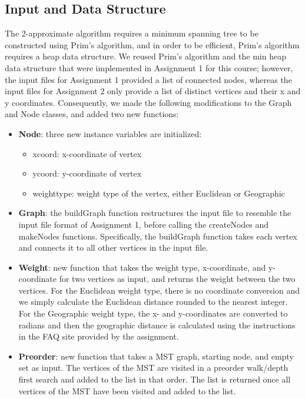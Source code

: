 \subsection{Input and Data Structure}
The 2-approximate algorithm requires a minimum spanning tree to be constructed using Prim's algorithm, and in order to be efficient, Prim's algorithm requires a heap data structure. We reused Prim's algorithm and the min heap data structure that were implemented in Assignment 1 for this course; however, the input files for Assignment 1 provided a list of connected nodes, whereas the input files for Assignment 2 only provide a list of distinct vertices and their x and y coordinates. Consequently, we made the following modifications to the Graph and Node classes, and added two new functions: 
\begin{itemize}
	\item  \textbf{Node}: three new instance variables are initialized:
	    \begin{itemize}
	    \item xcoord: x-coordinate of vertex
	    \item ycoord: y-coordinate of vertex
	    \item weighttype: weight type of the vertex, either Euclidean or Geographic
	    \end{itemize}
	\item  \textbf{Graph}: the buildGraph function restructures the input file to resemble the input file format of Assignment 1, before calling the createNodes and makeNodes functions. Specifically, the buildGraph function takes each vertex and connects it to all other vertices in the input file. 
	\item  \textbf{Weight}: new function that takes the weight type, x-coordinate, and y-coordinate for two vertices as input, and returns the weight between the two vertices. For the Euclidean weight type, there is no coordinate conversion and we simply calculate the Euclidean distance rounded to the nearest integer. For the Geographic weight type, the x- and y-coordinates are converted to radians and then the geographic distance is calculated using the instructions in the FAQ site provided by the assignment.
	\item  \textbf{Preorder}: new function that takes a MST graph, starting node, and empty set as input. The vertices of the MST are visited in a preorder walk/depth first search and added to the list in that order. The list is returned once all vertices of the MST have been visited and added to the list.   
	
\end{itemize}


